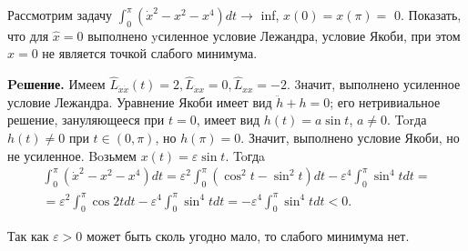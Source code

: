 \begin{task}
    Рассмотрим задачу $\int_0^\pi\left(\dot{x}^2-x^2-x^4\right) d t \rightarrow$ inf, $x(0)=x(\pi)=$ 0. 
    Показать, что для $\hat{x}=0$ выполнено yсиленное условие Лежандра, условие Якоби, 
    при этом $\hat{x}=0$ не является точкой слабого минимума.
    
    \textbf{Peшение.} Имеем $\hat{L}_{\dot{x} \dot{x}}(t)=2, \hat{L}_{\dot{x} x}=0, \hat{L}_{x x}=-2$. 3начит, выполнено усиленное условие Лежандра. Уравнение Якоби имеет вид $\ddot{h}+h=0$; его нетривиальное решение, зануляющееся при $t=0$, имеет вид $h(t)=a \sin t$, $a \neq 0$. Torда $h(t) \neq 0$ при $t \in(0, \pi)$, но $h(\pi)=0$. Значит, выполнено условие Якоби, но не усиленное.
    Boзьмем $x(t)=\varepsilon \sin t$. Toгдa
    $$
    \begin{gathered}
    \int_0^\pi\left(\dot{x}^2-x^2-x^4\right) d t=\varepsilon^2 \int_0^\pi\left(\cos ^2 t-\sin ^2 t\right) d t-\varepsilon^4 \int_0^\pi \sin ^4 t d t= \\
    =\varepsilon^2 \int_0^\pi \cos 2 t d t-\varepsilon^4 \int_0^\pi \sin ^4 t d t=-\varepsilon^4 \int_0^\pi \sin ^4 t d t<0 .
    \end{gathered}
    $$
    
    Так как $\varepsilon>0$ может быть сколь угодно мало, то слабого минимума нет.
\end{task}